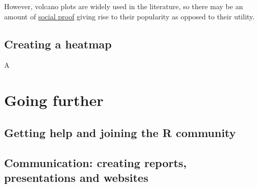 \documentclass[12pt,]{book}
\theoremstyle{definition}
\theoremstyle{definition}
\theoremstyle{definition}
\theoremstyle{remark}
\begin{document}
However, volcano plots are widely used in the literature, so there may
be an amount of \href{https://en.wikipedia.org/wiki/Social_proof}{social
proof} giving rise to their popularity as opposed to their utility.

\section{Creating a heatmap}\label{creating-a-heatmap}

A

\chapter{Going further}\label{going-further}

\section{Getting help and joining the R
community}\label{getting-help-and-joining-the-r-community}

\section{Communication: creating reports, presentations and
websites}\label{communication-creating-reports-presentations-and-websites}


\end{document}
